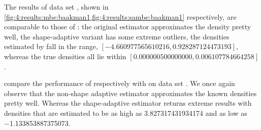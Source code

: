 		The results of data set \baakmanFour, shown in \cref{fig:4:results:mbe:baakman1,fig:4:results:sambe:baakman1} respectively, are comparable to those of \baakmanOne: the original estimator approximates the density pretty well, the shape-adaptive variant has some extreme outliers, the densities estimated by \sambe fall in the range, $\left[\num{-4.660977565610216}, \num{0.928287124473193}\right]$, whereas the true densities all lie within $\left[\num[scientific-notation=true]{0.000000500000000}, \num[scientific-notation=true]{0.006107784664258}\right]$.


		 compare the performance of respectively \mbe with \sambe on data set \baakmanFive. We once again observe that the non-shape adaptive estimator approximates the known densities pretty well. Whereas the shape-adaptive estimator returns extreme results with densities that are estimated to be as high as \num{3.827317431934174} and as low as \num{-1.133853887375073}.

